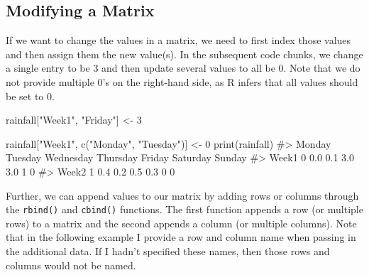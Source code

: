 \documentclass[
  letterpaper,
]{latex/krantz}
\makeatletter
\newenvironment{Shaded}{\begin{snugshade}}{\end{snugshade}}
\newcommand{\CommentTok}[1]{\textcolor[rgb]{0.37,0.37,0.37}{#1}}
\newcommand{\DecValTok}[1]{\textcolor[rgb]{0.68,0.00,0.00}{#1}}
\newcommand{\FunctionTok}[1]{\textcolor[rgb]{0.28,0.35,0.67}{#1}}
\newcommand{\NormalTok}[1]{\textcolor[rgb]{0.00,0.23,0.31}{#1}}
\newcommand{\OtherTok}[1]{\textcolor[rgb]{0.00,0.23,0.31}{#1}}
\newcommand{\StringTok}[1]{\textcolor[rgb]{0.13,0.47,0.30}{#1}}
\newenvironment{kframe}{%
\medskip{}
\setlength{\fboxsep}{.8em}
 \def\at@end@of@kframe{}%
 \ifinner\ifhmode%
  \def\at@end@of@kframe{\end{minipage}}%
  \begin{minipage}{\columnwidth}%
 \fi\fi%
 \def\FrameCommand##1{\hskip\@totalleftmargin \hskip-\fboxsep
 \colorbox{shadecolor}{##1}\hskip-\fboxsep
     \hskip-\linewidth \hskip-\@totalleftmargin \hskip\columnwidth}%
 \MakeFramed {\advance\hsize-\width
   \@totalleftmargin\z@ \linewidth\hsize
   \@setminipage}}%
 {\par\unskip\endMakeFramed%
 \at@end@of@kframe}
\renewenvironment{Shaded}{\begin{kframe}}{\end{kframe}}
\makeatother
\begin{document}
\subsection{\texorpdfstring{Modifying a Matrix
}{Modifying a Matrix }}\label{modifying-a-matrix}

If we want to change the values in a matrix, we need to first index
those values and then assign them the new value(s). In the subsequent
code chunks, we change a single entry to be 3 and then update several
values to all be 0. Note that we do not provide multiple 0's on the
right-hand side, as R infers that all values should be set to 0.

\begin{Shaded}
\begin{Highlighting}[]
\NormalTok{rainfall[}\StringTok{"Week1"}\NormalTok{, }\StringTok{"Friday"}\NormalTok{] }\OtherTok{\textless{}{-}} \DecValTok{3}
\end{Highlighting}
\end{Shaded}

\begin{Shaded}
\begin{Highlighting}[]
\NormalTok{rainfall[}\StringTok{"Week1"}\NormalTok{, }\FunctionTok{c}\NormalTok{(}\StringTok{"Monday"}\NormalTok{, }\StringTok{"Tuesday"}\NormalTok{)] }\OtherTok{\textless{}{-}} \DecValTok{0}
\FunctionTok{print}\NormalTok{(rainfall)}
\CommentTok{\#\textgreater{}       Monday Tuesday Wednesday Thursday Friday Saturday Sunday}
\CommentTok{\#\textgreater{} Week1      0     0.0       0.1      3.0    3.0        1      0}
\CommentTok{\#\textgreater{} Week2      1     0.4       0.2      0.5    0.3        0      0}
\end{Highlighting}
\end{Shaded}

Further, we can append values to our matrix by adding rows or columns
through the \texttt{rbind()}
and \texttt{cbind()}
functions. The first function appends a row (or multiple rows) to a
matrix and the second appends a column (or multiple columns). Note that
in the following example I provide a row and column name when passing in
the additional data. If I hadn't specified these names, then those rows
and columns would not be named.
\end{document}

